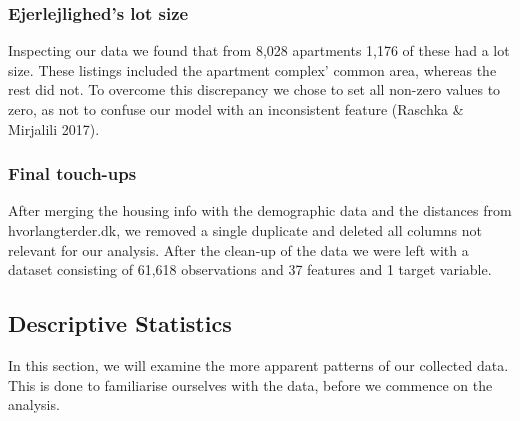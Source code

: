\documentclass[12pt,a4paper]{article}
\begin{document}
\subsubsection{Ejerlejlighed's lot size}
Inspecting our data we found that from 8,028 apartments 1,176 of these had a lot size. These listings included the apartment complex' common area, whereas the rest did not. To overcome this discrepancy we chose to set all non-zero values to zero, as not to confuse our model with an inconsistent feature (Raschka \& Mirjalili 2017).

\subsubsection{Final touch-ups}
After merging the housing info with the demographic data and the distances from hvorlangterder.dk, we removed a single duplicate and deleted all columns not relevant for our analysis. After the clean-up of the data we were left with a dataset consisting of 61,618  observations and 37 features and 1 target variable. 

\subsection{Descriptive Statistics}
In this section, we will examine the more apparent patterns of our collected data. This is done to familiarise ourselves with the data, before we commence on the analysis.
\end{document}
